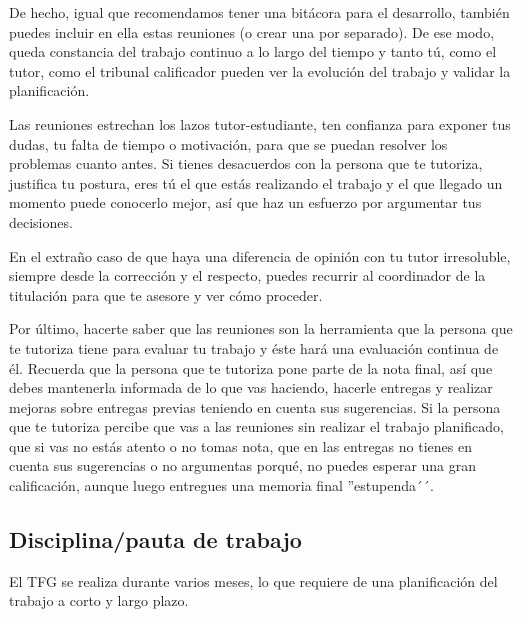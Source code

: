 De hecho, igual que recomendamos tener una bitácora para el desarrollo, también puedes incluir en ella estas reuniones (o crear una por separado). De ese modo, queda constancia del trabajo continuo a lo largo del tiempo y tanto tú, como el tutor, como el tribunal calificador pueden ver la evolución del trabajo y validar la planificación.

Las reuniones estrechan los lazos tutor-estudiante, ten confianza para exponer tus dudas, tu falta de tiempo o motivación, para que se puedan resolver los problemas cuanto antes. Si tienes desacuerdos con la persona que te tutoriza, justifica tu postura, eres tú el que estás realizando el trabajo y el que llegado un momento puede conocerlo mejor, así que haz un esfuerzo por argumentar tus decisiones. 

En el extraño caso de que haya una diferencia de opinión con tu tutor irresoluble, siempre desde la corrección y el respecto, puedes recurrir al coordinador de la titulación para que te asesore y ver cómo proceder. 


Por último, hacerte saber que las reuniones son la herramienta que la persona que te tutoriza tiene para evaluar tu trabajo y éste hará una evaluación continua de él. Recuerda que la persona que te tutoriza pone parte de la nota final, así que debes mantenerla informada de lo que vas haciendo, hacerle entregas y realizar mejoras sobre entregas previas teniendo en cuenta sus sugerencias. Si la persona que te tutoriza percibe que vas a las reuniones sin realizar el trabajo planificado, que si vas no estás atento o no tomas nota, que en las entregas no tienes en cuenta sus sugerencias o no argumentas porqué, no puedes esperar una gran calificación, aunque luego entregues una memoria final ''estupenda´´.

\subsection{Disciplina/pauta de trabajo}%

El TFG se realiza durante varios meses, lo que requiere de una planificación del trabajo a corto y largo plazo. 

